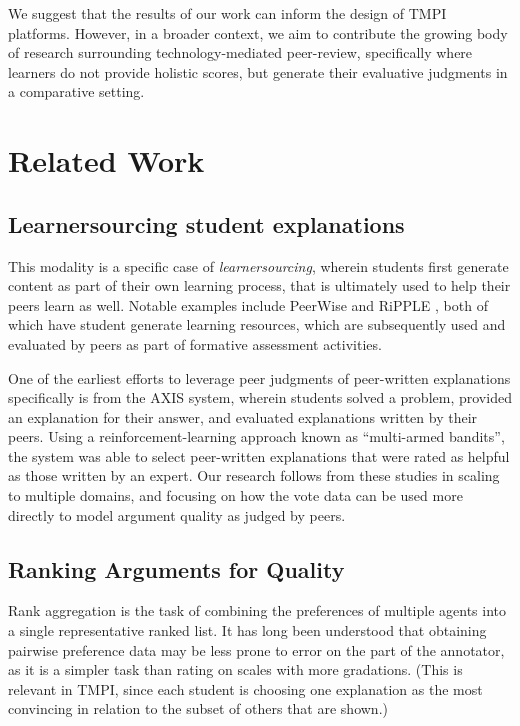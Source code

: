 \documentclass[acmsmall]{acmart}
\begin{document}
We suggest that the results of our work can inform the design of TMPI platforms.
However, in a broader context, we aim to contribute the growing body of 
research surrounding technology-mediated peer-review, specifically where 
learners do not provide holistic scores, but generate their evaluative 
judgments in a comparative setting.


\section{Related Work}

\subsection{Learnersourcing student explanations}
This modality is a specific case of  
\textit{learnersourcing}\cite{weir_learnersourcing_2015}, wherein students first
generate content as part of their own learning process, that is ultimately used 
to help their peers learn as well.
Notable examples include PeerWise \cite{denny_peerwise:_2008} and RiPPLE 
\cite{khosravi_ripple_2019}, both of which have student generate learning 
resources, which are subsequently used and evaluated by peers as part of 
formative assessment activities.

One of the earliest efforts to leverage peer judgments of peer-written 
explanations specifically is from the AXIS system\cite{williams_axis:_2016}, 
wherein students solved a problem, provided an explanation for their answer, 
and evaluated explanations written by their peers.
Using a reinforcement-learning approach known as ``multi-armed bandits'', the 
system was able to select peer-written explanations that were rated as helpful 
as those written by an expert.
Our research follows from these studies in scaling to multiple domains, and 
focusing on how the vote data can be used more directly to model argument 
quality as judged by peers.

\subsection{Ranking Arguments for Quality}
Rank aggregation is the task of combining the preferences of multiple agents 
into a single representative ranked list.
It has long been understood that obtaining pairwise preference data may be 
less prone to error on the part of the annotator, as it is a simpler task than 
rating on scales with more gradations. 
(This is relevant in TMPI, since each student is choosing one explanation as 
the most convincing in relation to the subset of others that are shown.)
 
\end{document}
